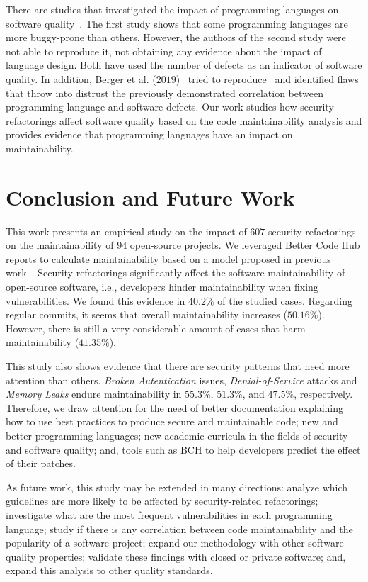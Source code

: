 \documentclass[10pt,conference]{IEEEtran}
\begin{document}
There are studies that investigated the impact of programming languages on software
quality~\cite{Ray:2014:LSS:2635868.2635922,Ray:2017:LSP:3144574.3126905}. The first
study shows that some programming languages are more buggy-prone than others. However,
the authors of the second study were not able to reproduce it, not obtaining any
evidence about the impact of language design. Both have used the number of
defects as an indicator of software quality. In addition,
Berger et al. ($2019$)~\cite{2019arXiv190110220B} tried to reproduce~\cite{Ray:2014:LSS:2635868.2635922,
Ray:2017:LSP:3144574.3126905} and identified flaws that throw into distrust the previously demonstrated
correlation between programming language and software defects. Our work studies how
security refactorings affect software quality based on the code maintainability
analysis and provides evidence that programming languages have an impact on
maintainability.

\section{Conclusion and Future Work}\label{sec:conclusions}

This work presents an empirical study on the impact of $607$ security
refactorings on the maintainability of $94$ open-source projects. We leveraged
Better Code Hub reports to calculate maintainability
based on a model proposed in previous work~\cite{Olivari:2018}. Security refactorings significantly
affect the software maintainability of open-source software, i.e., developers
hinder maintainability when fixing vulnerabilities. We found this evidence in
$40.2\%$ of the studied cases. Regarding regular commits, it seems that overall
maintainability increases ($50.16\%$). However, there is still a very
considerable amount of cases that harm maintainability ($41.35\%$).

This study also shows evidence that there are security patterns that need more
attention than others. \emph{Broken Autentication} issues,
\emph{Denial-of-Service} attacks and \emph{Memory Leaks} endure maintainability
in $55.3\%$, $51.3\%$, and $47.5\%$, respectively. Therefore, we draw attention
for the need of better documentation explaining how to use best practices to
produce secure and maintainable code; new and better programming languages; new
academic curricula in the fields of security and software quality; and, tools
such as BCH to help developers predict the effect of their patches.

As future work, this study may be extended in many directions: analyze which
guidelines are more likely to be affected by security-related refactorings;
investigate what are the most frequent vulnerabilities in each programming
language; study if there is any correlation between code maintainability and
the popularity of a software project; expand our methodology with other
software quality properties; validate these findings with closed or private
software; and, expand this analysis to other quality standards.
\end{document}
